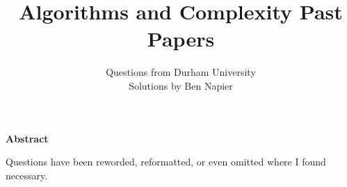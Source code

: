 \documentclass[a4paper, answers]{exam}
\title{Algorithms and Complexity Past Papers}
\author{
    Questions from Durham University \\ 
    Solutions by Ben Napier
}
\begin{document}
    \begin{titlepage}
        \maketitle
    \end{titlepage}

    \tableofcontents
    \clearpage

    \thispagestyle{empty}
    \vspace*{21.5em}
    \begin{center}
        \parbox{0.77\textwidth}{
            \noindent
            \begin{center}
                \normalsize\textbf{Abstract}
            \end{center}
            \vspace{-3pt}
            Questions have been reworded, reformatted, 
            or even omitted where I found necessary.
        }
    \end{center}
    \vspace*{\fill}

    \clearpage
    \begin{questions}
        
    \end{questions}
\end{document}
